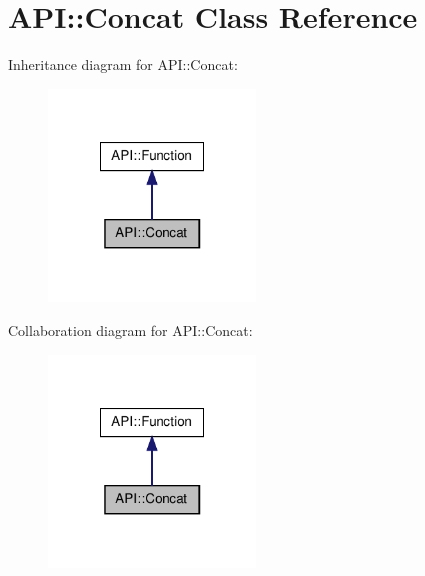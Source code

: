 \hypertarget{class_a_p_i_1_1_concat}{\section{A\-P\-I\-:\-:Concat Class Reference}
\label{class_a_p_i_1_1_concat}
}


Inheritance diagram for A\-P\-I\-:\-:Concat\-:\nopagebreak
\begin{figure}[H]
\begin{center}
\leavevmode
\includegraphics[width=156pt]{class_a_p_i_1_1_concat__inherit__graph}
\end{center}
\end{figure}


Collaboration diagram for A\-P\-I\-:\-:Concat\-:\nopagebreak
\begin{figure}[H]
\begin{center}
\leavevmode
\includegraphics[width=156pt]{class_a_p_i_1_1_concat__coll__graph}
\end{center}
\end{figure}
